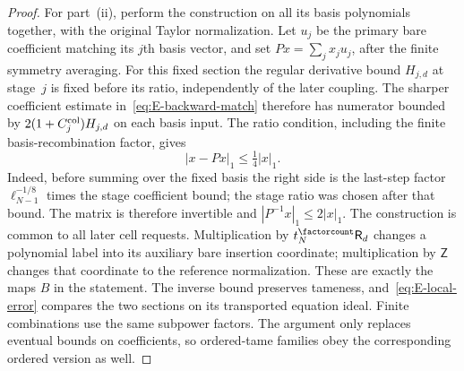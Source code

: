 \begin{proof}
For part~(ii), perform the construction on all its basis polynomials together, with the original Taylor normalization. Let $u_j$ be the primary bare coefficient matching its $j$th basis vector, and set $Px=\sum_jx_ju_j$, after the finite symmetry averaging. For this fixed section the regular derivative bound $H_{j,d}$ at stage~$j$ is fixed before its ratio, independently of the later coupling. The sharper coefficient estimate in~\eqref{eq:E-backward-match} therefore has numerator bounded by $2(1+C^{\rm col}_j)H_{j,d}$ on each basis input. The ratio condition, including the finite basis-recombination factor, gives
\begin{equation*}
 \left|x-Px\right|_1\le\tfrac14|x|_1.
\end{equation*}
Indeed, before summing over the fixed basis the right side is the last-step factor $\ell_{N-1}^{-1/8}$ times the stage coefficient bound; the stage ratio was chosen after that bound. The matrix is therefore invertible and $|P^{-1}x|_1\le2|x|_1$. The construction is common to all later cell requests. Multiplication by $t_N^{\factorcount}\mathsf R_d$ changes a polynomial label into its auxiliary bare insertion coordinate; multiplication by $\mathsf Z$ changes that coordinate to the reference normalization. These are exactly the maps $B$ in the statement. The inverse bound preserves tameness, and~\eqref{eq:E-local-error} compares the two sections on its transported equation ideal. Finite combinations use the same subpower factors. The argument only replaces eventual bounds on coefficients, so ordered-tame families obey the corresponding ordered version as well.
\end{proof}
